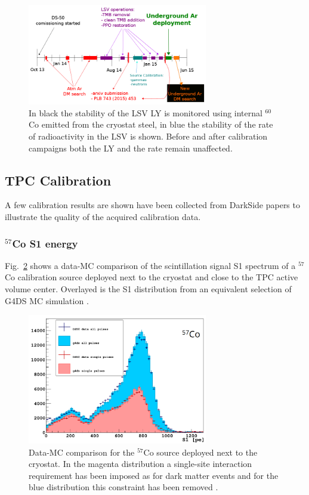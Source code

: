 \begin{figure}[htbp]
\centering
\includegraphics[width=0.7\textwidth]{./Figures/Yann_timeline.png}
\caption{In black the stability of the LSV LY is monitored using internal $^{60}$Co emitted from the cryostat steel, in blue the stability of the rate of radioactivity in the LSV is shown. Before and after calibration campaigns both the LY and the rate remain unaffected.
\label{fig:LSV:Stability}}
 \end{figure}


\subsection{TPC Calibration}
A few calibration results are shown have been collected from DarkSide papers to illustrate the quality of the acquired calibration data.

\subsubsection{$^{57}$Co S1 energy}
Fig.~\ref{fig:CalibData:Co57} shows a data-MC comparison of the scintillation signal S1 spectrum of a $^{57}$Co calibration source deployed next to the cryostat and close to the TPC active volume center. Overlayed is the S1 distribution from an equivalent selection of G4DS MC simulation \cite{DS50:G4DS:paper}.

\begin{figure}[htbp]
\centering
\includegraphics[width=0.7\textwidth]{./Figures/57Co_Paolo_G4DS_UCLA.png}
\caption{Data-MC comparison for the $^{57}$Co source deployed next to the cryostat. In the magenta distribution a single-site interaction requirement has been imposed as for dark matter events and for the blue distribution this constraint has been removed \cite{DS50:G4DS:paper}.
\label{fig:CalibData:Co57}}
 \end{figure}



